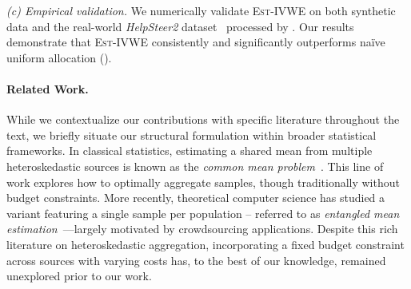 \documentclass{article}
\theoremstyle{plain}
\theoremstyle{definition}
\theoremstyle{plain}
\newcommand{\estivwe}{\textsc{Est-IVWE}}
\begin{document}
\emph{(c) Empirical validation.} We numerically validate \estivwe{} on both synthetic data and the real-world \emph{HelpSteer2} dataset~\citep{NEURIPS2024_02fd91a3} processed by \citet{saha2026budget}. Our results demonstrate that \estivwe{} consistently and significantly outperforms na\"{i}ve uniform allocation ({}).

\paragraph{Related Work.}

While we contextualize our contributions with specific literature throughout the text, we briefly situate our structural formulation within broader statistical frameworks.
In classical statistics, estimating a shared mean from multiple heteroskedastic sources is known as the \emph{common mean problem}~\citep{cochran1937problems,graybill-deal,norwood-hinkelmann}.
This line of work explores how to optimally aggregate samples, though traditionally without budget constraints.
More recently, theoretical computer science has studied a variant featuring a single sample per population -- referred to as \emph{entangled mean estimation}~\citep{chierichetti2014commonmean,liang2020entangled,diakonikolas2025entangled}—largely motivated by crowdsourcing applications.
Despite this rich literature on heteroskedastic aggregation, incorporating a fixed budget constraint across sources with varying costs has, to the best of our knowledge, remained unexplored prior to our work.
\end{document}
